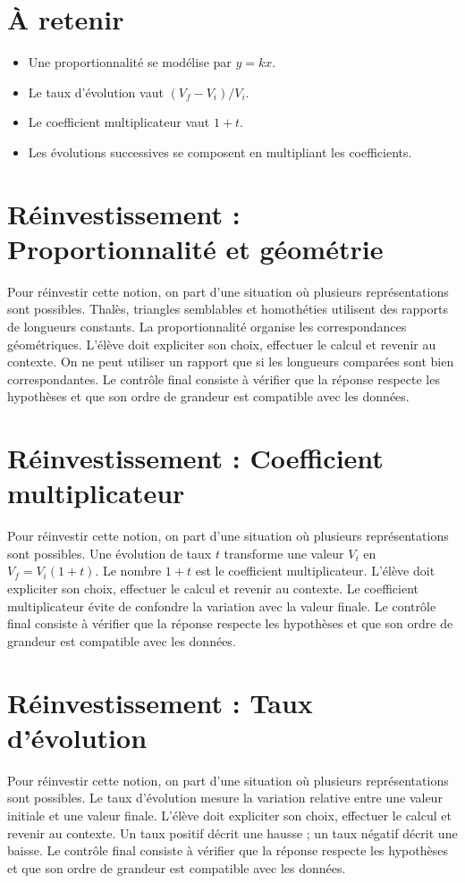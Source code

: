 \section{À retenir}
\begin{aretenir}
\begin{itemize}
\item Une proportionnalité se modélise par $y=kx$.
\item Le taux d’évolution vaut $(V_f-V_i)/V_i$.
\item Le coefficient multiplicateur vaut $1+t$.
\item Les évolutions successives se composent en multipliant les coefficients.
\end{itemize}
\end{aretenir}

\section{Réinvestissement : Proportionnalité et géométrie}
Pour réinvestir cette notion, on part d’une situation où plusieurs représentations sont possibles. Thalès, triangles semblables et homothéties utilisent des rapports de longueurs constants. La proportionnalité organise les correspondances géométriques. L’élève doit expliciter son choix, effectuer le calcul et revenir au contexte. On ne peut utiliser un rapport que si les longueurs comparées sont bien correspondantes. Le contrôle final consiste à vérifier que la réponse respecte les hypothèses et que son ordre de grandeur est compatible avec les données.

\section{Réinvestissement : Coefficient multiplicateur}
Pour réinvestir cette notion, on part d’une situation où plusieurs représentations sont possibles. Une évolution de taux $t$ transforme une valeur $V_i$ en $V_f=V_i(1+t)$. Le nombre $1+t$ est le coefficient multiplicateur. L’élève doit expliciter son choix, effectuer le calcul et revenir au contexte. Le coefficient multiplicateur évite de confondre la variation avec la valeur finale. Le contrôle final consiste à vérifier que la réponse respecte les hypothèses et que son ordre de grandeur est compatible avec les données.

\section{Réinvestissement : Taux d’évolution}
Pour réinvestir cette notion, on part d’une situation où plusieurs représentations sont possibles. Le taux d’évolution mesure la variation relative entre une valeur initiale et une valeur finale. L’élève doit expliciter son choix, effectuer le calcul et revenir au contexte. Un taux positif décrit une hausse ; un taux négatif décrit une baisse. Le contrôle final consiste à vérifier que la réponse respecte les hypothèses et que son ordre de grandeur est compatible avec les données.

